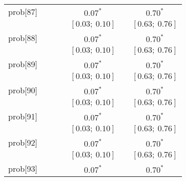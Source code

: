 \begin{table}
\begin{center}
\begin{tabular}{l c c c c c c }
prob[87]  &                           &                           &                           & $0.07^{*}$              &                           & $0.70^{*}$            \\
          &                           &                           &                           & $[0.03;\ 0.10]$         &                           & $[0.63;\ 0.76]$       \\
prob[88]  &                           &                           &                           & $0.07^{*}$              &                           & $0.70^{*}$            \\
          &                           &                           &                           & $[0.03;\ 0.10]$         &                           & $[0.63;\ 0.76]$       \\
prob[89]  &                           &                           &                           & $0.07^{*}$              &                           & $0.70^{*}$            \\
          &                           &                           &                           & $[0.03;\ 0.10]$         &                           & $[0.63;\ 0.76]$       \\
prob[90]  &                           &                           &                           & $0.07^{*}$              &                           & $0.70^{*}$            \\
          &                           &                           &                           & $[0.03;\ 0.10]$         &                           & $[0.63;\ 0.76]$       \\
prob[91]  &                           &                           &                           & $0.07^{*}$              &                           & $0.70^{*}$            \\
          &                           &                           &                           & $[0.03;\ 0.10]$         &                           & $[0.63;\ 0.76]$       \\
prob[92]  &                           &                           &                           & $0.07^{*}$              &                           & $0.70^{*}$            \\
          &                           &                           &                           & $[0.03;\ 0.10]$         &                           & $[0.63;\ 0.76]$       \\
prob[93]  &                           &                           &                           & $0.07^{*}$              &                           & $0.70^{*}$            \\

\end{tabular}
\end{center}
\end{table}
